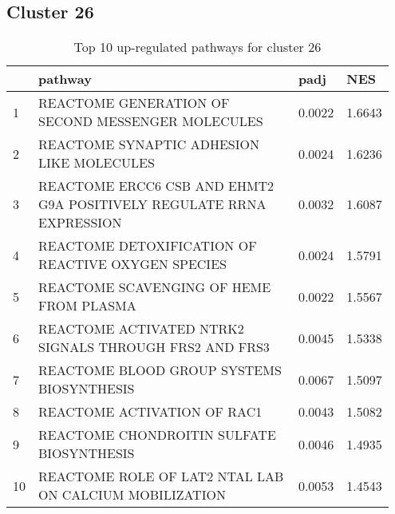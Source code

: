 \documentclass{article}
\begin{document}
\subsection{Cluster 26 }
\begin{table}[H]
\centering
\begin{tabular}{p{0.05\linewidth}p{0.7\linewidth}p{0.1\linewidth}p{0.1\linewidth}}
  \hline
 & pathway & padj & NES \\ 
  \hline
1 & REACTOME GENERATION OF SECOND MESSENGER MOLECULES & 0.0022 & 1.6643 \\ 
  2 & REACTOME SYNAPTIC ADHESION LIKE MOLECULES & 0.0024 & 1.6236 \\ 
  3 & REACTOME ERCC6 CSB AND EHMT2 G9A POSITIVELY REGULATE RRNA EXPRESSION & 0.0032 & 1.6087 \\ 
  4 & REACTOME DETOXIFICATION OF REACTIVE OXYGEN SPECIES & 0.0024 & 1.5791 \\ 
  5 & REACTOME SCAVENGING OF HEME FROM PLASMA & 0.0022 & 1.5567 \\ 
  6 & REACTOME ACTIVATED NTRK2 SIGNALS THROUGH FRS2 AND FRS3 & 0.0045 & 1.5338 \\ 
  7 & REACTOME BLOOD GROUP SYSTEMS BIOSYNTHESIS & 0.0067 & 1.5097 \\ 
  8 & REACTOME ACTIVATION OF RAC1 & 0.0043 & 1.5082 \\ 
  9 & REACTOME CHONDROITIN SULFATE BIOSYNTHESIS & 0.0046 & 1.4935 \\ 
  10 & REACTOME ROLE OF LAT2 NTAL LAB ON CALCIUM MOBILIZATION & 0.0053 & 1.4543 \\ 
   \hline
\end{tabular}
\caption{Top 10 up-regulated pathways for cluster 26} 
\label{tab:q3_2_26}
\end{table}
\end{document}
